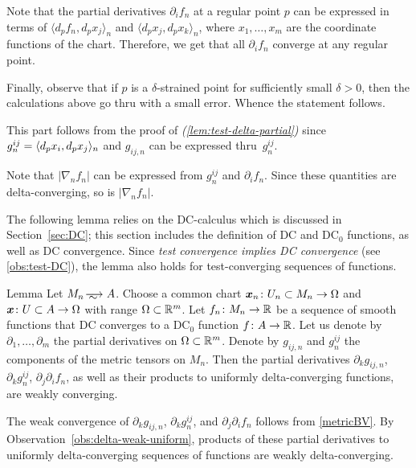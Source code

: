 Note that the partial derivatives $\partial_if_n$ at a regular point $p$ can be expressed in terms of $\langle d_pf_n,d_px_j\rangle_n$ and $\langle d_px_j,d_px_k\rangle_n$, where $x_1,\dots,x_m$ are the coordinate functions of the chart.
Therefore, we get that all $\partial_if_n$ converge at any regular point.

Finally, observe that if $p$ is a $\delta$-strained point for sufficiently small $\delta>0$,
then the calculations above go thru with a small error.
Whence the statement follows.

This part follows from the proof of \textit{(\ref{lem:test-delta-partial})} since $g^{ij}_n\zz=\langle d_px_i,d_px_j\rangle_n$ and $g_{ij,n}$ can be expressed thru~$g^{ij}_n$.

Note that $|\nabla_n f_n|$ can be expressed from $g^{ij}_n$ and $\partial_if_n$.
Since these quantities are delta-converging, so is $|\nabla_n f_n|$.
\qeds

The following lemma relies on the DC-calculus which is discussed in Section~\ref{sec:DC};
this section includes the definition of DC and DC$_0$ functions, as well as DC convergence.
Since \textit{test convergence implies DC convergence} (see \ref{obs:test-DC}),
the lemma also holds for test-converging sequences of functions.


\begin{thm}{Lemma}\label{lem:test-delta-partial-g}
Let $M_n\smooths{} A$.
Choose a common chart $\bm{x}_n\:U_n\subset M_n\zz\to \Omega$ and $\bm{x}\:U\subset A\zz\to \Omega$ with range $\Omega\subset \mathbb{R}^m$.
Let $f_n\colon M_n\to\mathbb{R}$ be a sequence of smooth functions that DC converges to a DC$_0$ function $f\colon A\to \mathbb{R}$.
Let us denote by $\partial_1,\dots,\partial_m$ the partial derivatives on $\Omega\subset \mathbb{R}^m$.
Denote by $g_{ij,n}$ and $g^{ij}_n$ the components of the metric tensors on $M_n$.
Then  the partial derivatives $\partial_kg_{ij,n}$, $\partial_k g^{ij}_n$,  $\partial_j\partial_if_n$, as well as their products to uniformly delta-converging functions,  are weakly converging.

\end{thm}

The weak convergence of $\partial_kg_{ij,n}$, $\partial_k g^{ij}_n$, and $\partial_j\partial_if_n$
follows from \ref{metricBV}.
By Observation~\ref{obs:delta-weak-uniform}, products of these partial derivatives to uniformly delta-converging sequences of functions are weakly delta-converging.

